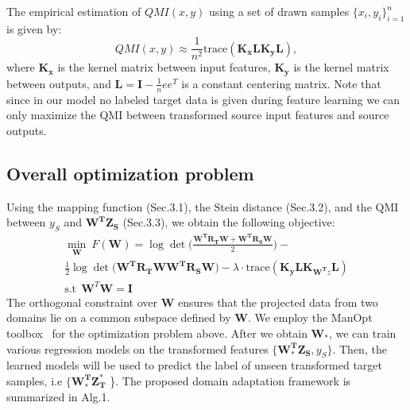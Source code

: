 \documentclass{article}
\newcommand{\todo}[1]{\textcolor{red}{#1}}
\begin{document}
The empirical estimation of $QMI(x,y)$ \cite{4928} using a set of drawn samples $\{x_i,y_i \}_{i=1}^n$ is given by:
\begin{equation}
	QMI(x,y)\approx \frac{1}{n^2} \text{trace} ( \boldsymbol{K_x} \boldsymbol{L} \boldsymbol{K_y}\boldsymbol{L} ),
\end{equation}
where $\boldsymbol{K_x}$ is the kernel matrix between input features, $\boldsymbol{K_y}$ is the kernel matrix between outputs, and $\boldsymbol{L}=\boldsymbol{I}-\frac{1}{n}e e^T $ is a constant centering matrix.  Note that since in our model no labeled target data is given during feature learning we can only maximize the QMI between transformed source input features and source outputs.


\subsection{Overall optimization problem}
	
Using the mapping function (Sec.3.1), the Stein distance (Sec.3.2), and the QMI between $y_S$ and $\boldsymbol{W^T} \boldsymbol{Z_S}$ (Sec.3.3), we obtain the following objective:
	\begin{multline} \min_{\boldsymbol{W}}  \ F(\boldsymbol{W})=\log \det \bigg( \frac{ \boldsymbol{W^T}  \boldsymbol{R_T} \boldsymbol{W}+ \boldsymbol{W^T}  \boldsymbol{R_S} \boldsymbol{W}}{2}\bigg)- \\
	\frac{1}{2}\log \det \big(\boldsymbol{W^T}  \boldsymbol{R_T} \boldsymbol{W} \boldsymbol{W^T} \boldsymbol{R_S} \boldsymbol{W} \big)
	-\lambda  \cdot \text{trace}(\boldsymbol{K_y}\boldsymbol{L} \boldsymbol{K}_{\boldsymbol{W^T}z} \boldsymbol{L})   \\   
	\text{s.t} \  \  \boldsymbol{W}^T \boldsymbol{W}=\boldsymbol{I} \label{main_obj}
	\end{multline}
The orthogonal constraint over $\boldsymbol{W}$ ensures that the projected data from two domains lie on a common subspace defined by $\boldsymbol{W}$. We employ the ManOpt toolbox~\cite{manopt} for the optimization problem above. After we obtain $\boldsymbol{W}_*$, we can train various regression models on the transformed features $\{\boldsymbol{W^T_*} \boldsymbol{Z_S}, y_S \}$. Then, the learned models will be used to predict the label of unseen transformed target samples, i.e $\{\boldsymbol{W^T_*}  \boldsymbol{Z^*_T}$ \}. The proposed domain adaptation framework is summarized in Alg.1.
\end{document}
